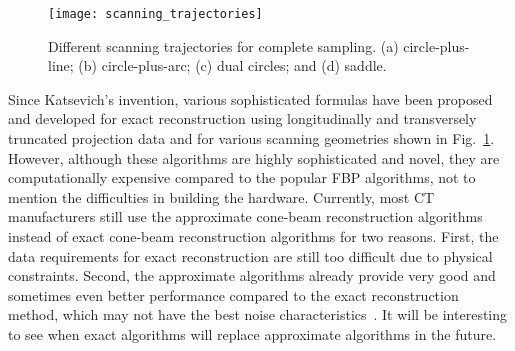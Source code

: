%
%
\begin{figure}[h]
\texttt{[image: scanning\_trajectories]}
\caption{Different scanning trajectories for complete sampling. (a) circle-plus-line; (b) circle-plus-arc; (c) dual circles; and (d) saddle.}
\label{fig:scanning_trajectories}
\end{figure}

Since Katsevich's invention, various sophisticated formulas have been proposed and developed for exact reconstruction using longitudinally and transversely truncated projection data and for various scanning geometries shown in Fig.~\ref{fig:scanning_trajectories}.  However, although these algorithms are highly sophisticated and novel, they are computationally expensive compared to the popular FBP algorithms, not to mention the difficulties in building the hardware.  Currently, most CT manufacturers still use the approximate cone-beam reconstruction algorithms instead of exact cone-beam reconstruction algorithms for two reasons.  First, the data requirements for exact reconstruction are still too difficult due to physical constraints.  Second, the approximate algorithms already provide very good and sometimes even better performance compared to the exact reconstruction method, which may not have the best noise characteristics~\citep{Wang2008}.  It will be interesting to see when exact algorithms will replace approximate algorithms in the future.


